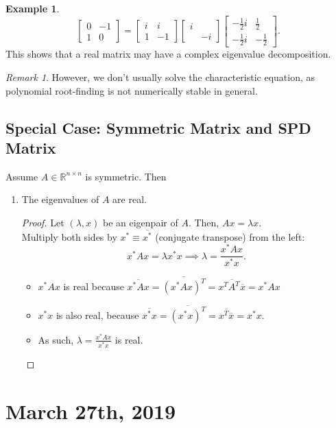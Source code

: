 \documentclass[12pt]{article}
\theoremstyle{definition}
\newtheorem{example}{Example}[section]
\theoremstyle{remark}
\newtheorem*{remark}{Remark}
\newcommand{\R}{\mathbb{R}}
\begin{document}
\begin{example}
\[	\begin{bmatrix} 0&-1\\1&0 \end{bmatrix} =\begin{bmatrix} i&i\\1&-1 \end{bmatrix} \begin{bmatrix} i&\\&-i \end{bmatrix} \begin{bmatrix} -\frac{1}{2}i&\frac{1}{2}\\-\frac{1}{2}i&-\frac{1}{2} \end{bmatrix} 
	.\] This shows that a real matrix may have a complex eigenvalue decomposition.
\end{example}
\begin{remark}
However, we don't usually solve the characteristic equation, as polynomial root-finding is not numerically stable in general.
	
\end{remark}
\subsection{Special Case: Symmetric Matrix and SPD Matrix}
Assume $A\in \R^{n\times n}$ is symmetric. Then
\begin{enumerate}
	\item The eigenvalues of $A$ are real.
		\begin{proof}
			Let $\left( \lambda,x \right) $ be an eigenpair of $A$. Then, $Ax=\lambda x$.\\Multiply both sides by $x^{*}\equiv \overline{x^{*}}$ (conjugate transpose) from the left: \[
			x^{*}Ax=\lambda x^{*}x\implies \lambda= \frac{x^*Ax}{x^*x}
		.\] 
		\begin{itemize}
			\item $x^*Ax$ is real because $\overline{x^*Ax}=\overline{\left( x^*Ax \right)^{T} }=\overline{x^{T}A^{T}\overline{x}}=x^*Ax$
			\item $x^*x$ is also real, because $\overline{x^{*}x}=\overline{\left( x^*x \right) ^{T}}=\overline{x^{T}\overline{x}}=x^*x$.
			\item As such, $\lambda= \frac{x^*Ax}{x^*x}$ is real.
\end{itemize}
		\end{proof}
\end{enumerate}
\section{March 27th, 2019}
\end{document}
